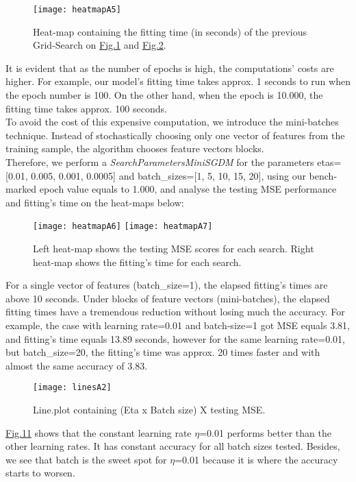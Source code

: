 \begin{figure}[H]
\label{fig:figA4}
\centering
\texttt{[image: heatmapA5]}
\caption{Heat-map containing the fitting time (in seconds) of the previous Grid-Search on \hyperref[fig:figA1]{Fig.1} and \hyperref[fig:figA2]{Fig.2}.}
\end{figure}

It is evident that as the number of epochs is high, the computations' costs are higher. For example, our model's fitting time takes approx. 1 seconds to run when the epoch number is 100. On the other hand, when the epoch is 10.000, the fitting time takes approx. 100 seconds.\\

To avoid the cost of this expensive computation, we introduce the mini-batches technique. Instead of stochastically choosing only one vector of features from the training sample, the algorithm chooses feature vectors blocks.\\

Therefore, we perform a \textit{SearchParametersMiniSGDM} for the parameters etas=[0.01, 0.005, 0.001, 0.0005] and batch\_sizes=[1, 5, 10, 15, 20], using our bench-marked epoch value equals to 1.000, and analyse the testing MSE performance and fitting's time on the heat-maps below:

\begin{figure}[H]
\label{fig:figA5}
\centering
\texttt{[image: heatmapA6]}
\texttt{[image: heatmapA7]}
\caption{Left heat-map shows the testing MSE scores for each search. Right heat-map shows the fitting's time for each search.}
\end{figure}

For a single vector of features (batch\_size=1), the elapsed fitting's times are above 10 seconds. Under blocks of feature vectors (mini-batches), the elapsed fitting times have a tremendous reduction without losing much the accuracy. For example, the case with learning rate=0.01 and batch-size=1 got MSE equals 3.81, and fitting's time equals 13.89 seconds, however for the same learning rate=0.01, but batch\_size=20, the fitting's time was approx. 20 times faster and with almost the same accuracy of 3.83.

\begin{figure}[H]
\label{fig:figA6}
\centering
\texttt{[image: linesA2]}
\caption{Line.plot containing (Eta x Batch size) X testing MSE.}
\end{figure}

\hyperref[fig:figA6]{Fig.11} shows that the constant learning rate $\eta$=0.01 performs better than the other learning rates. It has constant accuracy for all batch sizes tested. Besides, we see that batch is the sweet spot for $\eta$=0.01 because it is where the accuracy starts to worsen.\\

